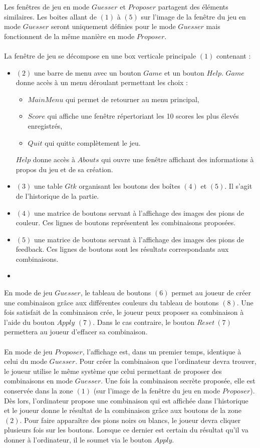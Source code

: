 Les fenêtres de jeu en mode $Guesser$ et $Proposer$ partagent des éléments similaires. Les boites allant de $(1)$ à $(5)$ sur l'image de la fenêtre du jeu en mode $Guesser$ seront uniquement définies pour le mode $Guesser$ mais fonctionnent de la même manière en mode $Proposer$.
\\\\
La fenêtre de jeu se décompose en une box verticale principale $(1)$ contenant :

\begin{itemize}
    \item $(2)$ une barre de menu avec un bouton $Game$ et un bouton $Help$. $Game$ donne accès à un menu déroulant permettant les choix :
    \begin{itemize}
        \item $Main Menu$ qui permet de retourner au menu principal,
        \item $Score$ qui affiche une fenêtre répertoriant les 10 scores les plus élevés enregistrés,
        \item $Quit$ qui quitte complètement le jeu.
    \end{itemize}
    $Help$ donne accès à $Abouts$ qui ouvre une fenêtre affichant des informations à propos du jeu et de sa création.
    \item $(3)$ une table $Gtk$ organisant les boutons des boîtes $(4)$ et $(5)$. Il s'agit de l'historique de la partie.
    \item $(4)$ une matrice de boutons servant à l'affichage des images des pions de couleur. Ces lignes de boutons représentent les combinaisons proposées.
    \item $(5)$ une matrice de boutons servant à l'affichage des images des pions de feedback. Ces lignes de boutons sont les résultats correspondants aux combinaisons.
    \item[]
\end{itemize}

En mode de jeu $Guesser$, le tableau de boutons $(6)$ permet au joueur de créer une combinaison grâce aux différentes couleurs du tableau de boutons $(8)$. Une fois satisfait de la combinaison crée, le joueur peux proposer sa combinaison à l'aide du bouton $Apply$ $(7)$. Dans le cas contraire, le bouton $Reset~(7)$ permettera au joueur d'effacer sa combinaison. 
\\\\
En mode de jeu $Proposer$, l'affichage est, dans un premier temps, identique à celui du mode $Guesser$. Pour créer la combinaison que l'ordinateur devra trouver, le joueur utilise le même système que celui permettant de proposer des combinaisons en mode $Guesser$. Une fois la combinaison secrète proposée, elle est conservée dans la zone $(1)$ (sur l'image de la fenêtre du jeu en mode $Proposer$). Dès lors, l'ordinateur propose une combinaison qui est affichée dans l'historique et le joueur donne le résultat de la combinaison grâce aux boutons de la zone $(2)$. Pour faire apparaître des pions noirs ou blancs, le joueur devra cliquer plusieurs fois sur les boutons. Lorsque ce dernier est certain du résultat qu'il va donner à l'ordinateur, il le soumet via le bouton $Apply$.

